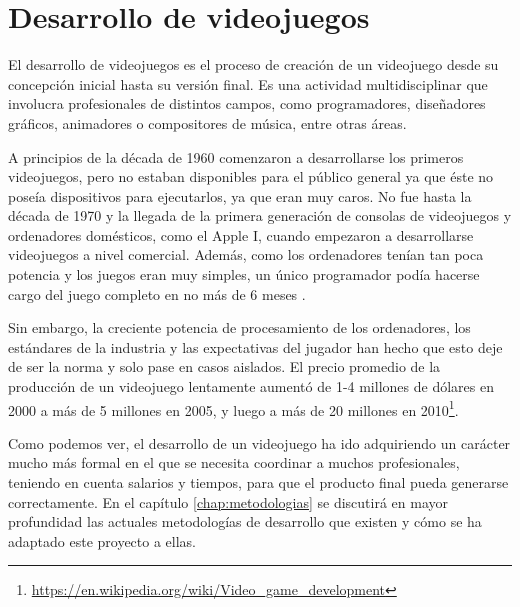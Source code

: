 \section{Desarrollo de videojuegos}

El desarrollo de videojuegos es el proceso de creación de un videojuego desde su concepción inicial hasta su versión final. Es una actividad multidisciplinar que involucra profesionales de distintos campos, como programadores, diseñadores gráficos, animadores o compositores de música, entre otras áreas.

A principios de la década de 1960 comenzaron a desarrollarse los primeros videojuegos, pero no estaban disponibles para el público general ya que éste no poseía dispositivos para ejecutarlos, ya que eran muy caros. No fue hasta la década de 1970 y la llegada de la primera generación de consolas de videojuegos y ordenadores domésticos, como el Apple I, cuando empezaron a desarrollarse videojuegos a nivel comercial. Además, como los ordenadores tenían tan poca potencia y los juegos eran muy simples, un único programador podía hacerse cargo del juego completo en no más de 6 meses \cite{next-gen-97}.

Sin embargo, la creciente potencia de procesamiento de los ordenadores, los estándares de la industria y las expectativas del jugador han hecho que esto deje de ser la norma y solo pase en casos aislados. El precio promedio de la producción de un videojuego lentamente aumentó de 1-4 millones de dólares en 2000 a más de 5 millones en 2005, y luego a más de 20 millones en 2010\footnote{\url{https://en.wikipedia.org/wiki/Video_game_development}}.

Como podemos ver, el desarrollo de un videojuego ha ido adquiriendo un carácter mucho más formal en el que se necesita coordinar a muchos profesionales, teniendo en cuenta salarios y tiempos, para que el producto final pueda generarse correctamente. En el capítulo \ref{chap:metodologias} se discutirá en mayor profundidad las actuales metodologías de desarrollo que existen y cómo se ha adaptado este proyecto a ellas.
